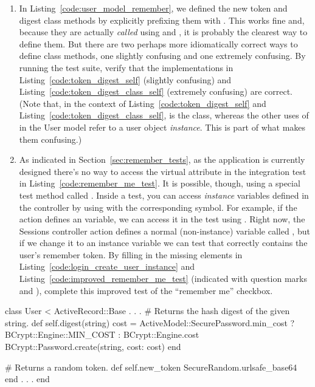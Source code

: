\begin{enumerate}

  \item In Listing~\ref{code:user_model_remember}, we defined the new token and digest class methods by explicitly prefixing them with . This works fine and, because they are actually \emph{called} using  and , it is probably the clearest way to define them. But there are two perhaps more idiomatically correct ways to define class methods, one slightly confusing and one extremely confusing. By running the test suite, verify that the implementations in Listing~\ref{code:token_digest_self} (slightly confusing) and Listing~\ref{code:token_digest_class_self} (extremely confusing) are correct. (Note that, in the context of Listing~\ref{code:token_digest_self} and Listing~\ref{code:token_digest_class_self},  is the  class, whereas the other uses of  in the User model refer to a user object \emph{instance}. This is part of what makes them confusing.)

  \item As indicated in Section~\ref{sec:remember_tests}, as the application is currently designed there's no way to access the virtual  attribute in the integration test in Listing~\ref{code:remember_me_test}. It is possible, though, using a special test method called . Inside a test, you can access \emph{instance} variables defined in the controller by using  with the corresponding symbol. For example, if the  action defines an  variable, we can access it in the test using . Right now, the Sessions controller  action defines a normal (non-instance) variable called , but if we change it to an instance variable we can test that  correctly contains the user's remember token. By filling in the missing elements in Listing~\ref{code:login_create_user_instance} and Listing~\ref{code:improved_remember_me_test} (indicated with question marks~ and ), complete this improved test of the ``remember me'' checkbox.

\end{enumerate}

\begin{codelisting}
\label{code:token_digest_self}
\begin{code}
class User < ActiveRecord::Base
  .
  .
  .
  # Returns the hash digest of the given string.
  def self.digest(string)
    cost = ActiveModel::SecurePassword.min_cost ? BCrypt::Engine::MIN_COST :
                                                  BCrypt::Engine.cost
    BCrypt::Password.create(string, cost: cost)
  end

  # Returns a random token.
  def self.new_token
    SecureRandom.urlsafe_base64
  end
  .
  .
  .
end
\end{code}
\end{codelisting}


